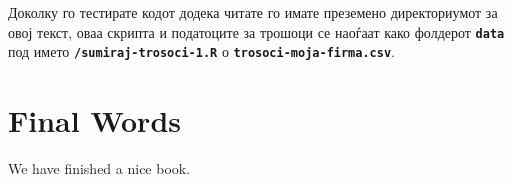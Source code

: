 \documentclass[
]{book}
\begin{document}
Доколку го тестирате кодот додека читате го имате преземено директориумот за овој текст, оваа скрипта и податоците за трошоци се наоѓаат како фолдерот \textbf{\texttt{data}} под името \textbf{\texttt{/sumiraj-trosoci-1.R}} о \textbf{\texttt{trosoci-moja-firma.csv}}.

\hypertarget{final-words}{%
\chapter{Final Words}\label{final-words}}

We have finished a nice book.

  
\end{document}
